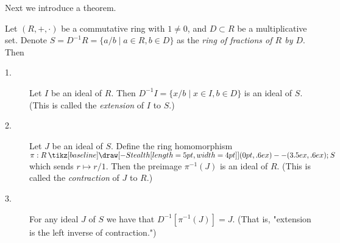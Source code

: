 \documentclass[12pt,letterpaper]{algebra_book}
\renewcommand{\to}{\mathbin{\tikz[baseline] \draw[-{Stealth[length=5pt,width=4pt]}] (0pt,.6ex) -- (3.5ex,.6ex);}}
\theoremstyle{definition}
\begin{document}
    Next we introduce a theorem. 
    \begin{thm}
        Let $(R, +, \cdot)$ be a commutative ring with $1 \ne 0$, and $D
        \subset R$ be a multiplicative set. Denote $S = D^{-1}R = \{a/b
        \mid a \in R, b \in D\}$ as the \textit{ring of fractions of $R$
        by $D$}. Then 
        \begin{description}
            \item[1.] Let $I$ be an ideal of $R$. Then $D^{-1}I =\{x/b
            \mid x \in I, b \in D\}$ is an ideal of $S$. (This is called
            the \textit{extension} of $I$ to $S$.)
    
            \item[2.] Let $J$ be an ideal of $S$. Define the ring
            homomorphism $\pi: R \to S$ which sends $r \mapsto r/1$. Then
            the preimage $\pi^{-1}(J)$ is an ideal of $R$. (This is
            called the \textit{contraction} of $J$ to $R$.)
    
            \item[3.] For any ideal $J$ of $S$ we have that $D^{-1}[\pi^{-1}(J)] = J$.
            (That is, "extension is the left inverse of
            contraction.")
        \end{description}
    \end{thm}
\end{document}
